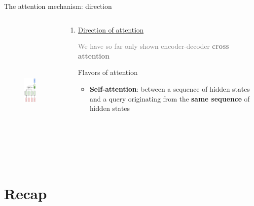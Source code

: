\documentclass[12pt,aspectratio=169,handout]{beamer}
\newcounter{saveenumi}
\newcommand{\conti}{\setcounter{enumi}{\value{saveenumi}}}
\begin{document}
\begin{frame}{The attention mechanism: direction}

	\begin{columns}[T] %
		\begin{column}{.4\textwidth}
			\begin{figure}[h]
				\includegraphics[height=7cm]{seq2seq_selfattn.pdf}
			\end{figure}
		\end{column}
		\begin{column}{.6\textwidth}
			\begin{enumerate}
				\conti
				\item \underline{Direction of attention}
		
				\textcolor{gray}{We have so far only shown encoder-decoder \textbf{cross attention}}
				\hspace{1em}
				
				Flavors of attention
				\begin{itemize}
					\item \textbf{Self-attention}:
					between a sequence of hidden states and a query originating from the \textbf{same sequence} of hidden states
				\end{itemize}
			\end{enumerate}
		\end{column}
	\end{columns}


\end{frame}

\section*{Recap}

%
%
%
%
\end{document}
